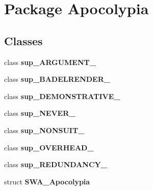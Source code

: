 \hypertarget{namespace_apocolypia}{\section{Package Apocolypia}
\label{namespace_apocolypia}
}
\subsection*{Classes}
\begin{DoxyCompactItemize}
\item 
class {\bfseries sup\+\_\+\+A\+R\+G\+U\+M\+E\+N\+T\+\_\+}
\item 
class {\bfseries sup\+\_\+\+B\+A\+D\+E\+L\+R\+E\+N\+D\+E\+R\+\_\+}
\item 
class {\bfseries sup\+\_\+\+D\+E\+M\+O\+N\+S\+T\+R\+A\+T\+I\+V\+E\+\_\+}
\item 
class {\bfseries sup\+\_\+\+N\+E\+V\+E\+R\+\_\+}
\item 
class {\bfseries sup\+\_\+\+N\+O\+N\+S\+U\+I\+T\+\_\+}
\item 
class {\bfseries sup\+\_\+\+O\+V\+E\+R\+H\+E\+A\+D\+\_\+}
\item 
class {\bfseries sup\+\_\+\+R\+E\+D\+U\+N\+D\+A\+N\+C\+Y\+\_\+}
\item 
struct {\bfseries S\+W\+A\+\_\+\+Apocolypia}
\end{DoxyCompactItemize}

